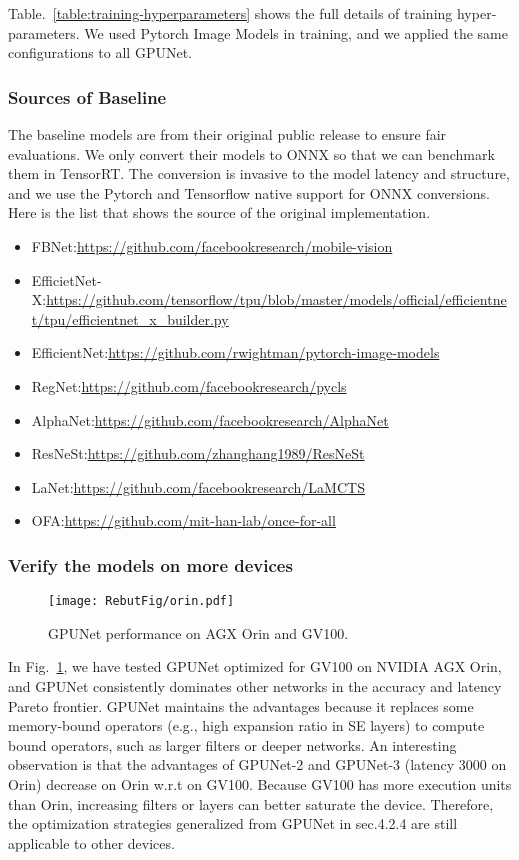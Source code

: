\documentclass[10pt,twocolumn,letterpaper]{article}
\begin{document}
Table.~\ref{table:training-hyperparameters} shows the full details of training hyper-parameters. We used Pytorch Image Models in training, and we applied the same configurations to all GPUNet. 

\subsubsection{Sources of Baseline}
\label{baseline_sources}
The baseline models are from their original public release to ensure fair evaluations. We only convert their models to ONNX so that we can benchmark them in TensorRT. The conversion is invasive to the model latency and structure, and we use the Pytorch and Tensorflow native support for ONNX conversions. Here is the list that shows the source of the original implementation.
\begin{itemize}
\item FBNet:\url{https://github.com/facebookresearch/mobile-vision}
\item EfficietNet-X:\url{https://github.com/tensorflow/tpu/blob/master/models/official/efficientnet/tpu/efficientnet_x_builder.py}
\item EfficientNet:\url{https://github.com/rwightman/pytorch-image-models}
\item RegNet:\url{https://github.com/facebookresearch/pycls}
\item AlphaNet:\url{https://github.com/facebookresearch/AlphaNet}
\item ResNeSt:\url{https://github.com/zhanghang1989/ResNeSt}
\item LaNet:\url{https://github.com/facebookresearch/LaMCTS}
\item OFA:\url{https://github.com/mit-han-lab/once-for-all}
\end{itemize}

\subsubsection{Verify the models on more devices}

\begin{figure}[t]
\centering
  \begin{center}
    \texttt{[image: RebutFig/orin.pdf]}
  \end{center}
    \caption{GPUNet performance on AGX Orin and GV100.}
    \label{gpunet_orin}
\end{figure}

In Fig.~\ref{gpunet_orin}, we have tested GPUNet optimized for GV100 on NVIDIA AGX Orin, and GPUNet consistently dominates other networks in the accuracy and latency Pareto frontier. GPUNet maintains the advantages because it replaces some memory-bound operators (e.g., high expansion ratio in SE layers) to compute bound operators, such as larger filters or deeper networks. An interesting observation is that the advantages of GPUNet-2 and GPUNet-3 (latency  3000 on Orin) decrease on Orin w.r.t on GV100. Because GV100 has more execution units than Orin, increasing filters or layers can better saturate the device. Therefore, the optimization strategies generalized from GPUNet in sec.4.2.4 are still applicable to other devices.
\end{document}
